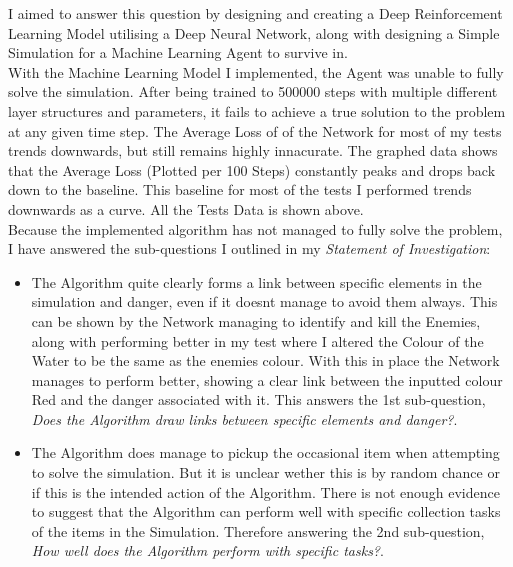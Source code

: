 \begin{flushleft}
        I aimed to answer this question by designing and creating a Deep Reinforcement Learning Model utilising a Deep Neural Network, along 
        with designing a Simple Simulation for a Machine Learning Agent to survive in. \\
        \vspace{0.2cm}
        With the Machine Learning Model I implemented, the Agent was unable to fully solve the simulation. After being trained to 500000
        steps with multiple different layer structures and parameters, it fails to achieve a true solution to the problem at any given time step.
        The Average Loss of of the Network for most of my tests trends downwards, but still remains highly innacurate. The graphed data shows
        that the Average Loss (Plotted per 100 Steps) constantly peaks and drops back down to the baseline. This baseline for most of the tests
        I performed trends downwards as a curve. All the Tests Data is shown above. \\
        \vspace{0.2cm}
        Because the implemented algorithm has not managed to fully solve the problem, I have answered the sub-questions I outlined in my 
        \textit{Statement of Investigation}: \\

        \begin{itemize}
            \item The Algorithm quite clearly forms a link between specific elements in the simulation and danger, even if it doesnt manage to avoid them
            always. This can be shown by the Network managing to identify and kill the Enemies, along with performing better in my test where I altered 
            the Colour of the Water to be the same as the enemies colour. With this in place the Network manages to perform better, showing a clear
            link between the inputted colour Red and the danger associated with it. This answers the 1st sub-question, \textit{Does the Algorithm draw 
            links between specific elements and danger?}. \\
            \vspace{0.2cm}

            \item The Algorithm does manage to pickup the occasional item when attempting to solve the simulation. But it is unclear wether this is by random
            chance or if this is the intended action of the Algorithm. There is not enough evidence to suggest that the Algorithm can perform well with
            specific collection tasks of the items in the Simulation. Therefore answering the 2nd sub-question, \textit{How well does the Algorithm perform 
            with specific tasks?}. \\
            \vspace{0.2cm}


\end{itemize}
\end{flushleft}
